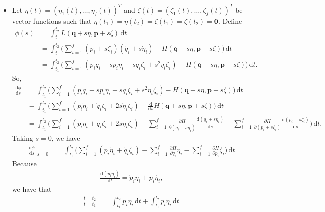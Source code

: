 \documentclass[10pt]{article}
\newcommand{\dee}{\mathrm{d}}
\newcommand{\ve}[1]{\mathbf{#1}}
\begin{document}
\begin{itemize}
    \item Let $\eta(t) = (\eta_1(t), \dotsc, \eta_f(t))^T$ and $\zeta(t) = (\zeta_1(t), \dotsc, \zeta_f(t))^T$ be vector functions such that $\eta(t_1) = \eta(t_2) = \zeta(t_1) = \zeta(t_2) = \ve{0}$. Define
    \begin{align*}
      \phi(s) 
      &= \int_{t_1}^{t_2} \overline{L}(\ve{q} + s\eta, \ve{p} + s\zeta)\, \dee t \\
      &= \int_{t_1}^{t_2} \bigg( \sum_{i=1}^f (p_i + s\zeta_i) (\dot{q}_i + s\dot{\eta}_i) - H(\ve{q} + s\eta, \ve{p} + s\zeta) \bigg)\, \dee t \\
      &= \int_{t_1}^{t_2} \bigg( \sum_{i=1}^f (p_i \dot{q}_i + sp_i \dot{\eta}_i + s \dot{q}_i \zeta_i + s^2 \dot{\eta}_i \zeta_i) - H(\ve{q} + s\eta, \ve{p} + s\zeta) \bigg)\, \dee t.
    \end{align*}
    So,
    \begin{align*}
      \frac{\dee \phi}{\dee s}
      &= \int_{t_1}^{t_2} \bigg( \sum_{i=1}^f (p_i \dot{q}_i + sp_i \dot{\eta}_i + s \dot{q}_i \zeta_i + s^2 \dot{\eta}_i \zeta_i) - H(\ve{q} + s\eta, \ve{p} + s\zeta) \bigg)\, \dee t \\
      &= \int_{t_1}^{t_2} \bigg( \sum_{i=1}^f (p_i \dot{\eta}_i + \dot{q}_i \zeta_i + 2s \dot{\eta}_i \zeta_i) - \frac{\dee}{\dee s}H(\ve{q} + s\eta, \ve{p} + s\zeta) \bigg)\, \dee t \\
      &= \int_{t_1}^{t_2} \bigg( \sum_{i=1}^f (p_i \dot{\eta}_i + \dot{q}_i \zeta_i + 2s \dot{\eta}_i \zeta_i) - \sum_{i=1}^f \frac{\partial H}{\partial(q_i + s\eta_i)}\frac{\dee (q_i + s\eta_i)}{\dee s} -\sum_{i=1}^f \frac{\partial H}{\partial(p_i + s\zeta_i)}\frac{\dee (p_i + s\zeta_i)}{\dee s} \bigg)\, \dee t.
    \end{align*}
    Taking $s = 0$, we have
    \begin{align*}
      \frac{\dee \phi}{\dee s}\bigg|_{s=0}
      &= \int_{t_1}^{t_2} \bigg( \sum_{i=1}^f (p_i \dot{\eta}_i + \dot{q}_i \zeta_i ) - \sum_{i=1}^f \frac{\partial H}{\partial q_i}\eta_i -\sum_{i=1}^f \frac{\partial H}{\partial p_i}\zeta_i \bigg)\, \dee t
    \end{align*}
    Because
    \begin{align*}
      \frac{\dee (p_i \eta_i)}{\dee t} = \dot{p}_i \eta_i + p_i \dot{\eta_i},
    \end{align*}
    we have that
    \begin{align*}
      [p_i \eta_i]_{t=t_1}^{t=t_2}
      &= \int_{t_1}^{t_2} \dot{p}_i \eta_i\, \dee t + \int_{t_1}^{t_2} p_i \dot{\eta}_i\, \dee t \\

\end{align*}
\end{itemize}
\end{document}
